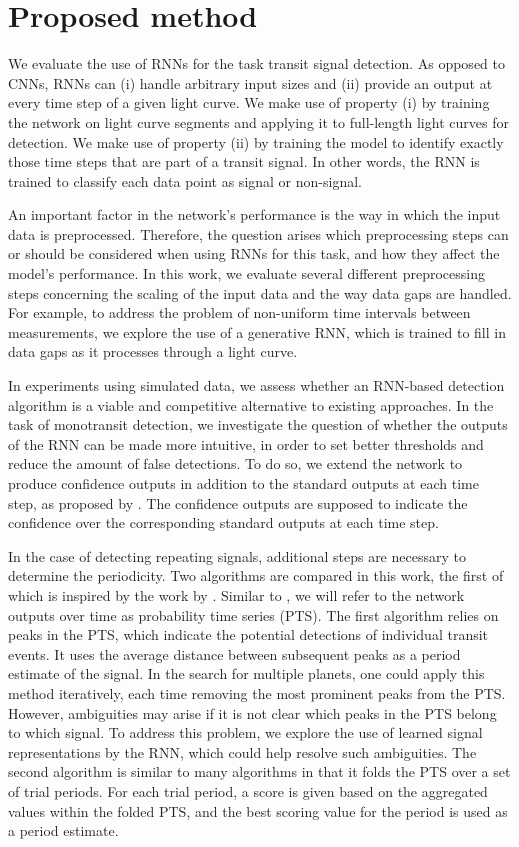
\section{Proposed method}
\label{sec:proposed}

We evaluate the use of RNNs for the task transit signal detection. As opposed to CNNs, RNNs can (i) handle arbitrary input sizes and (ii) provide an output at every time step of a given light curve. We make use of property (i) by training the network on light curve segments and applying it to full-length light curves for detection. We make use of property (ii) by training the model to identify exactly those time steps that are part of a transit signal. In other words, the RNN is trained to classify each data point as signal or non-signal.

An important factor in the network's performance is the way in which the input data is preprocessed. Therefore, the question arises which preprocessing steps can or should be considered when using RNNs for this task, and how they affect the model’s performance. In this work, we evaluate several different preprocessing steps concerning the scaling of the input data and the way data gaps are handled. For example, to address the problem of non-uniform time intervals between measurements, we explore the use of a generative RNN, which is trained to fill in data gaps as it processes through a light curve. 

In experiments using simulated data, we assess whether an RNN-based detection algorithm is a viable and competitive alternative to existing approaches. In the task of monotransit detection, we investigate the question of whether the outputs of the RNN can be made more intuitive, in order to set better thresholds and reduce the amount of false detections. To do so, we extend the network to produce confidence outputs in addition to the standard outputs at each time step, as proposed by \cite{devries2018learning}. The confidence outputs are supposed to indicate the confidence over the corresponding standard outputs at each time step.

In the case of detecting repeating signals, additional steps are necessary to determine the periodicity. Two algorithms are compared in this work, the first of which is inspired by the work by \cite{pearson2018searching}. Similar to \cite{pearson2018searching}, we will refer to the network outputs over time as probability time series (PTS). The first algorithm relies on peaks in the PTS, which indicate the potential detections of individual transit events. It uses the average distance between subsequent peaks as a period estimate of the signal. In the search for multiple planets, one could apply this method iteratively, each time removing the most prominent peaks from the PTS. However, ambiguities may arise if it is not clear which peaks in the PTS belong to which signal. To address this problem, we explore the use of learned signal representations by the RNN, which could help resolve such ambiguities.  The second algorithm is similar to many algorithms in that it folds the PTS over a set of trial periods. For each trial period, a score is given based on the aggregated values within the folded PTS, and the best scoring value for the period is used as a period estimate.

